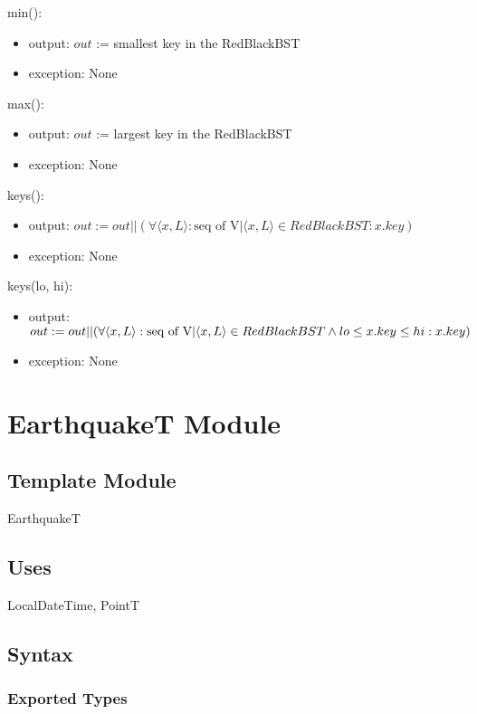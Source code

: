 \documentclass[12pt]{article}
\begin{document}
\noindent min():
\begin{itemize}
\item output: $out$ := smallest key in the RedBlackBST
\item exception: None
\end{itemize}

\noindent max():
\begin{itemize}
\item output: $out$ := largest key in the RedBlackBST
\item exception: None
\end{itemize}

\noindent keys():
\begin{itemize}
\item output: $out := out || (\forall \langle x, L \rangle : \text{seq of V} | \langle x, L \rangle \in RedBlackBST : x.key)$
\item exception: None
\end{itemize}

\noindent keys(lo, hi):
\begin{itemize}
\item output: $out := out || (\forall \langle x, L \rangle : \text{seq of V} | \langle x, L \rangle \in RedBlackBST \wedge\\
lo \le x.key \le hi : x.key)$
\item exception: None
\end{itemize}

\newpage

\section* {EarthquakeT Module}

\subsection* {Template Module}

EarthquakeT

\subsection* {Uses}

LocalDateTime, PointT

\subsection* {Syntax}

\subsubsection* {Exported Types}
\end{document}
